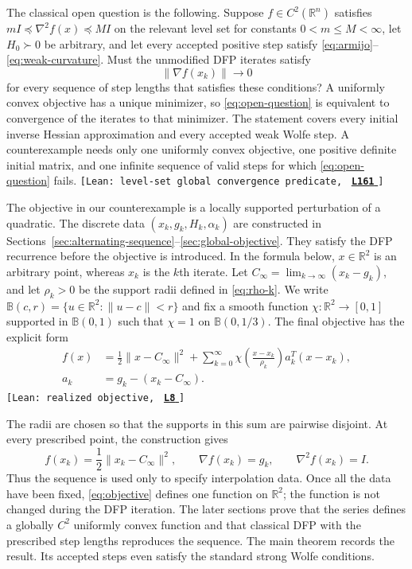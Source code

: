 \documentclass[11pt]{article}
\newcommand{\R}{\mathbb R}
\newcommand{\leanLinkText}[1]{%
  \underline{\textbf{#1}}%
}
\newcommand{\leanSnapshot}{e308927f5b7930bdd002f0c0e42b9d112ad821cb}
\newcommand{\leanClaimTag}[3]{%
  {\footnotesize\texttt{[Lean: #1, }}%
  \href{https://github.com/imathwy/DFP_wolfe_local/blob/\leanSnapshot/#2?plain=1\#L#3}%
    {\leanLinkText{\footnotesize\texttt{L#3}}}%
  {\footnotesize\texttt{]}}\enspace
}
\begin{document}
The classical open question is the following.  Suppose
$f\in C^2(\R^n)$ satisfies
$mI\preceq\nabla^2f(x)\preceq MI$ on the relevant level set for constants
$0<m\le M<\infty$, let $H_0\succ0$ be arbitrary, and let every accepted
positive step satisfy \eqref{eq:armijo}--\eqref{eq:weak-curvature}.  Must the
unmodified DFP iterates satisfy
\begin{equation}\label{eq:open-question}
\|\nabla f(x_k)\|\longrightarrow0
\end{equation}
for every sequence of step lengths that satisfies these conditions?  A
uniformly convex objective has a unique minimizer, so
\eqref{eq:open-question} is equivalent to
convergence of the iterates to that minimizer.  The statement covers every
initial inverse Hessian approximation and every accepted weak Wolfe step.  A
counterexample needs only one uniformly convex objective, one positive
definite initial matrix, and one infinite sequence of valid steps for which
\eqref{eq:open-question} fails.
\leanClaimTag{level-set global convergence predicate}{ReasLib/Optimization/DFP/LevelSetGlobalConvergence.lean}{161}

The objective in our counterexample is a locally supported perturbation of a
quadratic.  The discrete data $(x_k,g_k,H_k,\alpha_k)$ are constructed in
Sections~\ref{sec:alternating-sequence}--\ref{sec:global-objective}.  They
satisfy the DFP recurrence before the objective is introduced.  In the formula
below, $x\in\R^2$ is an arbitrary point, whereas $x_k$ is the $k$th iterate.
Let $C_\infty=\lim_{k\to\infty}(x_k-g_k)$, and let $\rho_k>0$ be the support
radii defined in \eqref{eq:rho-k}.  We write
$\mathbb B(c,r)=\{u\in\R^2:\|u-c\|<r\}$ and fix a smooth function
$\chi:\R^2\to[0,1]$ supported in $\mathbb B(0,1)$ such that $\chi=1$ on
$\mathbb B(0,1/3)$.  The final objective has the explicit form
\begin{equation}\label{eq:objective}
\begin{aligned}
f(x)&=\frac12\|x-C_\infty\|^2
+\sum_{k=0}^\infty
\chi\!\left(\frac{x-x_k}{\rho_k}\right)a_k^T(x-x_k),\\
a_k&=g_k-(x_k-C_\infty).
\end{aligned}
\end{equation}
\leanClaimTag{realized objective}{DFPWolfe/A_uniformly_convex_counterexample_to_global_convergence_of_DFP_under_weak_Wolfe_/Definition_5_11_Global_realized_objective.lean}{8}
The radii are chosen so that the supports in this sum are pairwise disjoint.
At every prescribed point, the construction gives
\[
f(x_k)=\frac12\|x_k-C_\infty\|^2,\qquad
\nabla f(x_k)=g_k,\qquad
\nabla^2f(x_k)=I.
\]
Thus the sequence is used only to specify interpolation data.  Once all the
data have been fixed, \eqref{eq:objective} defines one function on $\R^2$;
the function is not changed during the DFP iteration.  The later sections
prove that the series defines a globally $C^2$ uniformly convex function and
that classical DFP with the prescribed step lengths reproduces the sequence.
The main theorem records the result.  Its accepted steps even satisfy the
standard strong Wolfe conditions.
\end{document}
